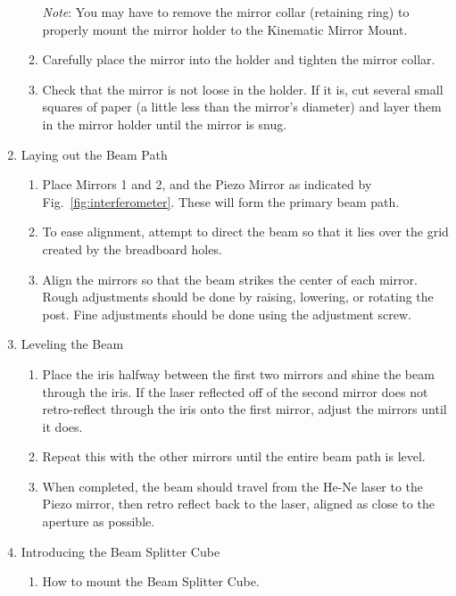 \begin{enumerate}
\begin{enumerate}
        \emph{Note}: You may have to remove the mirror collar (retaining ring)
        to properly mount the mirror holder to the Kinematic Mirror Mount.
        \item Carefully place the mirror into the holder and tighten the mirror
        collar.
        \item Check that the mirror is not loose in the holder. If it is, cut
        several small squares of paper (a little less than the mirror's
        diameter) and layer them in the mirror holder until the mirror is snug.
        \end{enumerate}
    \item Laying out the Beam Path
        \begin{enumerate}
        \item Place Mirrors 1 and 2, and the Piezo Mirror as indicated by
        Fig.~\ref{fig:interferometer}. These will form the primary beam path.
        \item To ease alignment, attempt to direct the beam so that it lies over
        the grid created by the breadboard holes.
        \item Align the mirrors so that the beam strikes the center of each
        mirror. Rough adjustments should be done by raising, lowering, or
        rotating the post. Fine adjustments should be done using the adjustment
        screw.
        \end{enumerate}
    \item Leveling the Beam
    \label{step:leveling}
        \begin{enumerate}
        \item Place the iris halfway between the first two mirrors and shine the
        beam through the iris. If the laser reflected off of the
        second mirror does not retro-reflect through the iris onto the first mirror,
        adjust the mirrors until it does.
        \item Repeat this with the other mirrors until the entire beam path is
        level.
        \item When completed, the beam should travel from the He-Ne laser to the
        Piezo mirror, then retro reflect back to the laser, aligned as close to
        the aperture as possible.
        \end{enumerate}
    \item Introducing the Beam Splitter Cube
        \begin{enumerate}
		\item How to mount the Beam Splitter Cube.

\end{enumerate}
\end{enumerate}
